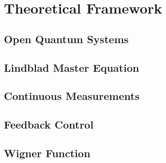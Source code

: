 \section{Theoretical Framework}
\subsection{Open Quantum Systems}
\subsection{Lindblad Master Equation}
\subsection{Continuous Measurements}
\subsection{Feedback Control}
\subsection{Wigner Function}